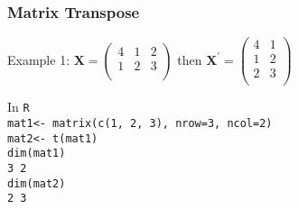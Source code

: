 \documentclass{beamer}
\numberwithin{equation}{section}
\begin{document}
\begin{frame}
\frametitle{Matrix Transpose}

Example 1:  $\boldsymbol{X} = \begin{pmatrix} 4 & 1 & 2 \\1 & 2  & 3 \\ \end{pmatrix} $ then 
$\boldsymbol{X}^{'} = \begin{pmatrix} 4 & 1 \\ 1 & 2 \\ 2 & 3 \\ \end{pmatrix} $ \\

\vspace{0.25in} 

In {\tt R } \\
{\tt mat1<- matrix(c(1, 2, 3), nrow=3, ncol=2) } \\
{\tt mat2<-  t(mat1)  } \\
{\tt dim(mat1) } \\
{\tt 3 2 } \\
{\tt dim(mat2) } \\
{\tt 2  3 } \\


\end{frame}
\end{document}
